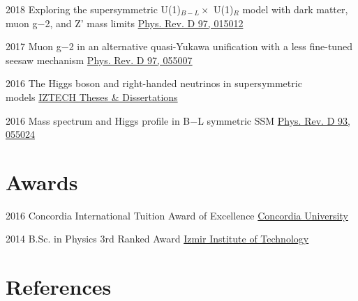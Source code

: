\documentclass[]{friggeri-cv}
\begin{document}
\begin{entrylist}
	
	\entry
	{2018}
	{Exploring the supersymmetric U(1)$_{B-L} \times$ U(1)$_R$ model with dark matter, muon g−2, and Z' mass limits}
	{\href{https://journals.aps.org/prd/abstract/10.1103/PhysRevD.97.015012}{Phys. Rev. D 97, 015012}} 
	
	\entry
	{2017}
	{Muon g−2 in an alternative quasi-Yukawa unification with a less fine-tuned seesaw mechanism}
	{\href{http://journals.aps.org/prd/abstract/10.1103/PhysRevD.97.055007}{Phys. Rev. D 97, 055007}} 
	
	\entry
	{2016}
	{The Higgs boson and right-handed neutrinos in supersymmetric \\ models}
	{\href{http://openaccess.iyte.edu.tr/xmlui/handle/11147/2842}{IZTECH Theses \& Dissertations}} 
	
	\entry
	{2016}
	{Mass spectrum and Higgs profile in B−L symmetric SSM}
	{\href{http://journals.aps.org/prd/abstract/10.1103/PhysRevD.93.055024}{Phys. Rev. D 93, 055024}} 
	
\end{entrylist}

\section{Awards}

\begin{entrylist}


\entry
{2016}
{Concordia International Tuition Award of Excellence}
{\href{http://www.concordia.ca}{Concordia University}} 	


\entry
{2014}
{B.Sc. in Physics 3rd Ranked Award}
{\href{http://www.iyte.edu.tr/AnaSayfa.aspx?d=ENG}{Izmir Institute of Technology}} 	
	
	
\end{entrylist}	
	


\section{References}
	
\end{document}
